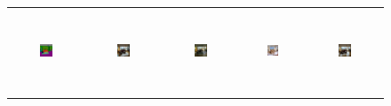 \begin{figure}[]
\begin{tabular} {cc|cc|c}

\includegraphics[width=0.1932\textwidth,height=0.96in]{Images/Rec/ADE/label/ADE_val_00000532.png} & \includegraphics[width=0.1932\textwidth,height=0.96in]{Images/Rec/ADE/gt/ADE_val_00000532.jpg} &
\includegraphics[width=0.1932\textwidth,height=0.96in]{Images/Rec/ADE/pix2pixhd/ADE_val_00000532.jpg} &   \includegraphics[width=0.1932\textwidth,height=0.80in]{Images/Rec/ADE/spade/ADE_val_00000532.jpg} &  \includegraphics[width=0.1932\textwidth,height=0.96in]{Images/Rec/ADE/ours/ADE_val_00000532.png} \\



\end{tabular}
\end{figure}
